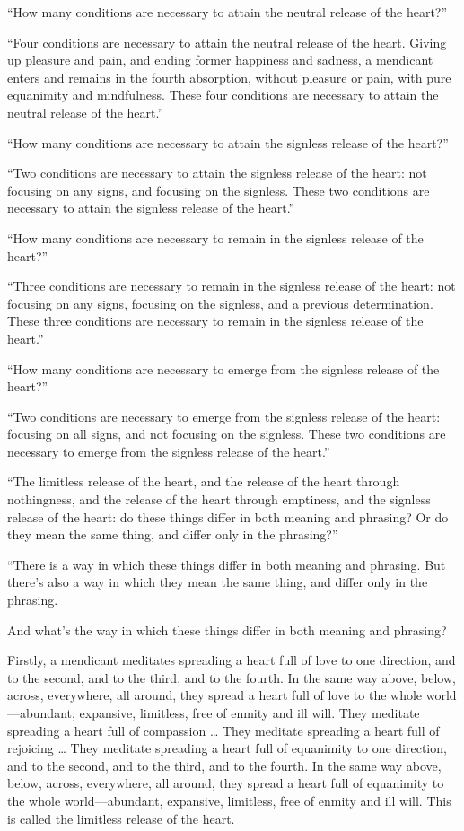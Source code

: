 \documentclass[12pt,openany]{book}%
\begin{document}
“How many conditions are necessary to attain the neutral release of the heart?” 

“Four conditions are necessary to attain the neutral release of the heart. Giving up pleasure and pain, and ending former happiness and sadness, a mendicant enters and remains in the fourth absorption, without pleasure or pain, with pure equanimity and mindfulness. These four conditions are necessary to attain the neutral release of the heart.” 

“How many conditions are necessary to attain the signless release of the heart?” 

“Two conditions are necessary to attain the signless release of the heart: not focusing on any signs, and focusing on the signless. These two conditions are necessary to attain the signless release of the heart.” 

“How many conditions are necessary to remain in the signless release of the heart?” 

“Three conditions are necessary to remain in the signless release of the heart: not focusing on any signs, focusing on the signless, and a previous determination. These three conditions are necessary to remain in the signless release of the heart.” 

“How many conditions are necessary to emerge from the signless release of the heart?” 

“Two conditions are necessary to emerge from the signless release of the heart: focusing on all signs, and not focusing on the signless. These two conditions are necessary to emerge from the signless release of the heart.” 

“The limitless release of the heart, and the release of the heart through nothingness, and the release of the heart through emptiness, and the signless release of the heart: do these things differ in both meaning and phrasing? Or do they mean the same thing, and differ only in the phrasing?” 

“There is a way in which these things differ in both meaning and phrasing. But there’s also a way in which they mean the same thing, and differ only in the phrasing. 

And what’s the way in which these things differ in both meaning and phrasing? 

Firstly, a mendicant meditates spreading a heart full of love to one direction, and to the second, and to the third, and to the fourth. In the same way above, below, across, everywhere, all around, they spread a heart full of love to the whole world—abundant, expansive, limitless, free of enmity and ill will. They meditate spreading a heart full of compassion … They meditate spreading a heart full of rejoicing … They meditate spreading a heart full of equanimity to one direction, and to the second, and to the third, and to the fourth. In the same way above, below, across, everywhere, all around, they spread a heart full of equanimity to the whole world—abundant, expansive, limitless, free of enmity and ill will. This is called the limitless release of the heart. 
\end{document}
